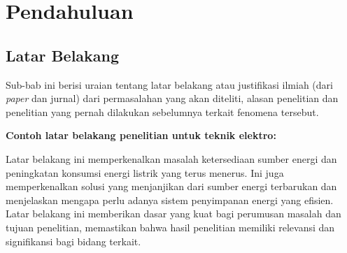 \chapter{Pendahuluan}

\section{Latar Belakang}

Sub-bab ini berisi uraian tentang latar belakang atau justifikasi ilmiah (dari \textit{paper} dan jurnal) dari permasalahan yang akan diteliti, alasan penelitian dan penelitian yang pernah dilakukan sebelumnya terkait fenomena tersebut.

\noindent\textbf{Contoh latar belakang penelitian untuk teknik elektro:} \\
\noindent{}

\vspace{5mm}
Latar belakang ini memperkenalkan masalah ketersediaan sumber energi dan 
peningkatan konsumsi energi listrik yang terus menerus. Ini juga memperkenalkan solusi 
yang menjanjikan dari sumber energi terbarukan dan menjelaskan mengapa perlu adanya 
sistem penyimpanan energi yang efisien. Latar belakang ini memberikan dasar yang kuat 
bagi perumusan masalah dan tujuan penelitian, memastikan bahwa hasil penelitian 
memiliki relevansi dan signifikansi bagi bidang terkait.


